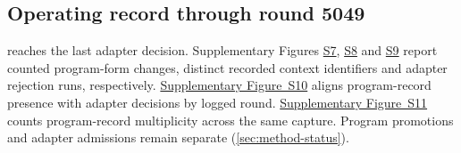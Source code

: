 \subsection{Operating record through round 5049}\label{app:stopped-run-record}

 reaches the last adapter decision.
Supplementary Figures
\href{eurekazero_supplement.pdf#supp-program-complexity-changes}{S7},
\href{eurekazero_supplement.pdf#supp-program-promotion-contexts}{S8} and
\href{eurekazero_supplement.pdf#supp-adapter-rejection-runs}{S9}
report counted program-form changes, distinct recorded context
identifiers and adapter rejection runs, respectively.
\href{eurekazero_supplement.pdf#supp-program-event-concurrence}{Supplementary Figure~S10}
aligns program-record presence with adapter decisions by logged round.
\href{eurekazero_supplement.pdf#supp-program-record-multiplicity}{Supplementary Figure~S11}
counts program-record multiplicity across the same capture.
Program promotions and adapter admissions remain separate
(\cref{sec:method-status}).

